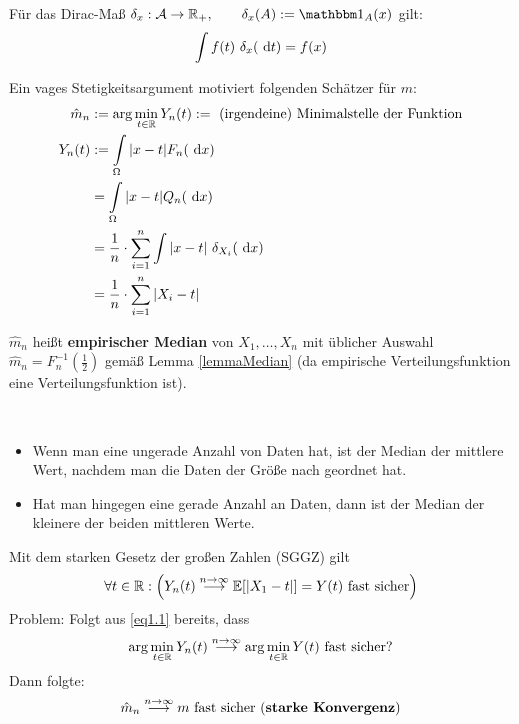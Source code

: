 \begin{erinnerung}
	Für das Dirac-Maß $\delta_x:\A\to\R_+,\qquad\delta_x(A):=\indi_A(x)$ gilt:
	\begin{align*}
		\int\limits f(t)~\delta_x(\text{ d} t)=f(x)
	\end{align*}
\end{erinnerung}

Ein vages Stetigkeitsargument motiviert folgenden Schätzer für $m$:
\begin{align*}
	\hat{m}_n&:=\arg\min\limits_{t\in\mathbb{R}}Y_n(t):=\text{ (irgendeine) Minimalstelle der Funktion}\\
	Y_n(t)&:=\int\limits_\Omega |x-t|F_n(\text{ d} x)\\ 
	&=\int\limits_\Omega |x-t|Q_n(\text{ d} x)\\ 
	&=\frac{1}{n}\cdot\sum\limits_{i=1}^n\int\limits|x-t|~\delta_{X_i}(\text{ d} x)\\
	&=\frac{1}{n}\cdot\sum\limits_{i=1}^n|X_i-t|
\end{align*} 

$\hat{m}_n$ heißt \textbf{empirischer Median} von $X_1,\ldots,X_n$ mit üblicher Auswahl $\hat{m}_n=F_n^{-1}\left(\frac{1}{2}\right)$ gemäß Lemma \ref{lemmaMedian} (da empirische Verteilungsfunktion eine Verteilungsfunktion ist).


\begin{bemerkung}\
	\begin{itemize}
		\item Wenn man eine ungerade Anzahl von Daten hat, ist der Median der mittlere Wert, nachdem man die Daten der Größe nach geordnet hat.
		\item Hat man hingegen eine gerade Anzahl an Daten, dann ist der Median der kleinere der beiden mittleren Werte.
	\end{itemize}
\end{bemerkung}

Mit dem starken Gesetz der großen Zahlen (SGGZ) gilt
\begin{align}\label{eq1.1}
	\forall t\in\mathbb{R}: \Big(Y_n(t)\stackrel{n\to\infty}{\longrightarrow}
	\mathbb{E}[|X_1-t|]=Y(t)\text{ fast sicher}\Big)
\end{align}
Problem: Folgt aus \eqref{eq1.1} bereits, dass
\begin{align*}
	\arg\min\limits_{t\in\mathbb{R}} Y_n(t)
	\stackrel{n\to\infty}{\longrightarrow}
	\arg\min\limits_{t\in\mathbb{R}}
	Y(t)\text{ fast sicher?}
\end{align*}
Dann folgte:
\begin{align*}
	\hat{m}_n
	\stackrel{n\to\infty}{\longrightarrow}
	m\text{ fast sicher (\textbf{starke Konvergenz})}
\end{align*}

